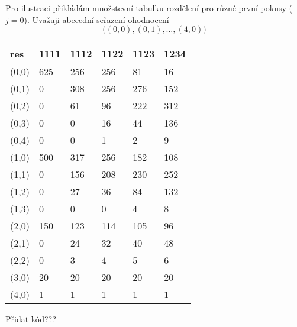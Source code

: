 Pro ilustraci přikládám množstevní tabulku rozdělení pro různé první pokusy ($j = 0$). Uvažuji abecední seřazení ohodnocení 
\[ \big( (0,0), (0,1), \dots, (4,0) \big) \]

\begin{table}[b!]
    \centering
    
    \begin{tabular}{l l l l l l}
    \toprule
    
        res & 1111 & 1112 & 1122 & 1123 & 1234 \\ 
    \midrule
        
        (0,0)& 625 & 256 & 256 & 81 & 16 \\ 
        (0,1)& 0 & 308 & 256 & 276 & 152 \\ 
        (0,2)& 0 & 61 & 96 & 222 & 312 \\ 
        (0,3)& 0 & 0 & 16 & 44 & 136 \\ 
        (0,4)& 0 & 0 & 1 & 2 & 9 \\ 
        (1,0)& 500 & 317 & 256 & 182 & 108 \\ 
        (1,1)& 0 & 156 & 208 & 230 & 252 \\ 
        (1,2)& 0 & 27 & 36 & 84 & 132 \\ 
        (1,3)& 0 & 0 & 0 & 4 & 8 \\ 
        (2,0)& 150 & 123 & 114 & 105 & 96 \\ 
        (2,1)& 0 & 24 & 32 & 40 & 48 \\ 
        (2,2)& 0 & 3 & 4 & 5 & 6 \\ 
        (3,0)& 20 & 20 & 20 & 20 & 20 \\ 
        (4,0)& 1 & 1 & 1 & 1 & 1 \\ 
    \bottomrule
    \end{tabular}
\end{table}

Přidat kód???




